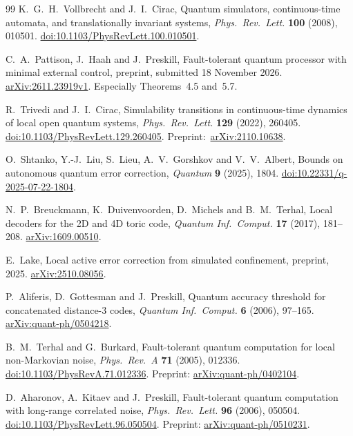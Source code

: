 \begin{thebibliography}{99}
K.~G.~H.~Vollbrecht and J.~I.~Cirac,
Quantum simulators, continuous-time automata, and translationally invariant systems,
\emph{Phys.~Rev.~Lett.} \textbf{100} (2008), 010501.
\href{https://doi.org/10.1103/PhysRevLett.100.010501}{doi:10.1103/PhysRevLett.100.010501}.


C.~A.~Pattison, J.~Haah and J.~Preskill,
Fault-tolerant quantum processor with minimal external control,
preprint, submitted 18 November 2026.
\href{https://arxiv.org/abs/2611.23919v1}{arXiv:2611.23919v1}.
Especially Theorems~4.5 and~5.7.

R.~Trivedi and J.~I.~Cirac,
Simulability transitions in continuous-time dynamics of local open quantum systems,
\emph{Phys.~Rev.~Lett.} \textbf{129} (2022), 260405.
\href{https://doi.org/10.1103/PhysRevLett.129.260405}{doi:10.1103/PhysRevLett.129.260405}.
Preprint:~\href{https://arxiv.org/abs/2110.10638}{arXiv:2110.10638}.

O.~Shtanko, Y.-J.~Liu, S.~Lieu, A.~V.~Gorshkov and V.~V.~Albert,
Bounds on autonomous quantum error correction,
\emph{Quantum} \textbf{9} (2025), 1804.
\href{https://doi.org/10.22331/q-2025-07-22-1804}{doi:10.22331/q-2025-07-22-1804}.

N.~P.~Breuckmann, K.~Duivenvoorden, D.~Michels and B.~M.~Terhal,
Local decoders for the 2D and 4D toric code,
\emph{Quantum Inf.~Comput.} \textbf{17} (2017), 181--208.
\href{https://arxiv.org/abs/1609.00510}{arXiv:1609.00510}.

E.~Lake,
Local active error correction from simulated confinement,
preprint, 2025.
\href{https://arxiv.org/abs/2510.08056}{arXiv:2510.08056}.

P.~Aliferis, D.~Gottesman and J.~Preskill,
Quantum accuracy threshold for concatenated distance-3 codes,
\emph{Quantum Inf.~Comput.} \textbf{6} (2006), 97--165.
\href{https://arxiv.org/abs/quant-ph/0504218}{arXiv:quant-ph/0504218}.

B.~M.~Terhal and G.~Burkard,
Fault-tolerant quantum computation for local non-Markovian noise,
\emph{Phys.~Rev.~A} \textbf{71} (2005), 012336.
\href{https://doi.org/10.1103/PhysRevA.71.012336}{doi:10.1103/PhysRevA.71.012336}.
Preprint: \href{https://arxiv.org/abs/quant-ph/0402104}{arXiv:quant-ph/0402104}.

D.~Aharonov, A.~Kitaev and J.~Preskill,
Fault-tolerant quantum computation with long-range correlated noise,
\emph{Phys.~Rev.~Lett.} \textbf{96} (2006), 050504.
\href{https://doi.org/10.1103/PhysRevLett.96.050504}{doi:10.1103/PhysRevLett.96.050504}.
Preprint: \href{https://arxiv.org/abs/quant-ph/0510231}{arXiv:quant-ph/0510231}.

\end{thebibliography}
